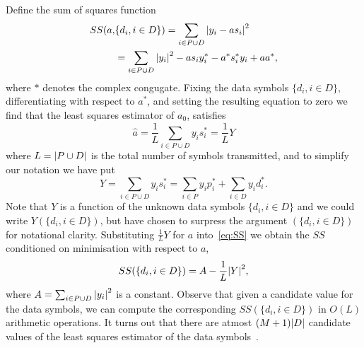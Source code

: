 \documentclass[journal]{IEEEtran}
\begin{document}
Define the sum of squares function
\begin{align}
SS(a, &\{d_i, i \in D\}) = \sum_{i \in P \cup D} {\left\vert  y_i - a s_i  \right\vert}^2 \nonumber \\
&= \sum_{i \in P \cup D} {\left\vert y_i \right\vert}^2 - a s_i y_i^* - a^* s_i^* y_i + aa^*, \label{eq:SS}
\end{align}
where $*$ denotes the complex congugate.  Fixing the data symbols $\{d_i, i \in D\}$, differentiating with respect to $a^*$, and setting the resulting equation to zero we find that the least squares estimator of $a_0$, satisfies
\begin{equation}\label{eq:hata}
\hat{a} = \frac{1}{L} \sum_{i \in P \cup D} y_i s_i^* = \frac{1}{L} Y
\end{equation}
where $L = {\left\vert P \cup D \right\vert}$ is the total number of symbols transmitted, and to simplify our notation we have put 
\[
Y = \sum_{i \in P \cup D} y_i s_i^* = \sum_{i \in P } y_i p_i^* + \sum_{i \in D } y_i d_i^*.
\]  
Note that $Y$ is a function of the unknown data symbols $\{ d_i, i \in D\}$ and we could write $Y(\{ d_i, i \in D\})$, but have chosen to surpress the argument $(\{ d_i, i \in D\})$ for notational clarity.  Substituting $\frac{1}{L}Y$ for $a$ into~\eqref{eq:SS} we obtain the $SS$ conditioned on minimisation with respect to $a$,
\begin{equation}\label{eq:SSdatasymbols}
SS(\{d_i, i \in D\}) = A - \frac{1}{L}{\left\vert Y \right\vert}^2,
\end{equation}
where $A = \sum_{i \in P \cup D}{\left\vert y_i \right\vert}^2$ is a constant.  Observe that given a candidate value for the data symbols, we can compute the corresponding $SS(\{d_i, i \in D\})$ in $O(L)$ arithmetic operations.  It turns out that there are atmost $(M+1){\left\vert D \right\vert}$ candidate values of the least squares estimator of the data symbols~\cite{Sweldens2001,Mackenthun1994}.  %
\end{document}
